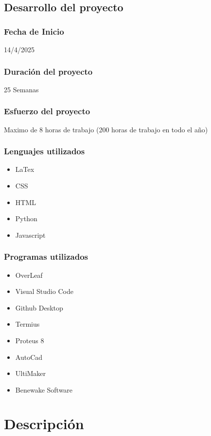 \documentclass[12pt,a4paper]{article}
\begin{document}
\subsection{Desarrollo del proyecto}
\subsubsection*{Fecha de Inicio}
14/4/2025
\subsubsection*{Duración del proyecto}
25 Semanas
\subsubsection*{Esfuerzo del proyecto}
Maximo de 8 horas de trabajo (200 horas de trabajo en todo el año)
\subsubsection*{Lenguajes utilizados}
\begin{itemize}
\item LaTex
\item CSS
\item HTML
\item Python
\item Javascript
\end{itemize}

\subsubsection*{Programas utilizados}

\begin{itemize}
    \item OverLeaf
    \item Visual Studio Code
    \item Github Desktop
    \item Termius
    \item Proteus 8
    \item AutoCad
    \item UltiMaker
    \item Benewake Software
\end{itemize}

\section{Descripción}
\end{document}
